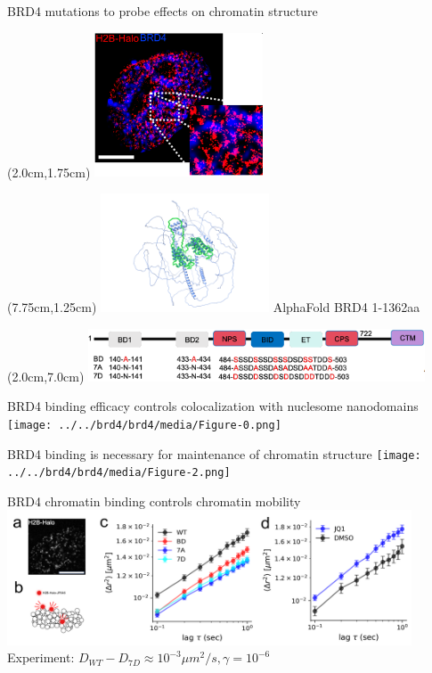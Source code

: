 \documentclass{beamer}					%
\begin{document}
\begin{frame}{BRD4 mutations to probe effects on chromatin structure}

\begin{textblock*}{5cm}(2.0cm,1.75cm)
\includegraphics[width=5cm]{../../dissertation/dissertation/media/TwoColor}
\end{textblock*}

\begin{textblock*}{5cm}(7.75cm,1.25cm)
\includegraphics[width=5cm]{../../brd4/brd4/media/AlphaFoldStructure}
\;\; AlphaFold BRD4 1-1362aa 
\end{textblock*}

\begin{textblock*}{10cm}(2.0cm,7.0cm)
\includegraphics[width=10cm]{../../brd4/brd4/media/Mutations}
\end{textblock*}

\end{frame}

\begin{frame}{BRD4 binding efficacy controls colocalization with nuclesome nanodomains}
\texttt{[image: ../../brd4/brd4/media/Figure-0.png]}
\end{frame}

\begin{frame}{BRD4 binding is necessary for maintenance of chromatin structure}
\texttt{[image: ../../brd4/brd4/media/Figure-2.png]}
\end{frame}

\begin{frame}{BRD4 chromatin binding controls chromatin mobility}
\includegraphics[width=12cm]{../../brd4/brd4/media/Figure-3}
Experiment: $D_{WT} - D_{7D} \approx 10^{-3} \mu m^{2}/s, \gamma = 10^{-6}$

\end{frame}
\end{document}
